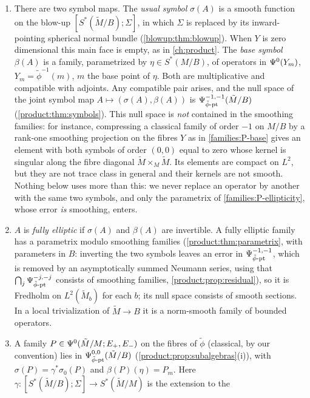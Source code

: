 \begin{enumerate}[label=(P\arabic*)]
\item\label{families:P-symbols} There are two symbol maps. The \emph{usual
  symbol} $\sigma(A)$ is a smooth function on the blow-up
  $[S^*(\tilde M/B);\Sigma]$, in which $\Sigma$ is replaced by its inward-pointing
  spherical normal bundle (\cref{blowup:thm:blowup}). When $Y$ is
  zero dimensional this main face is empty, as in \cref{ch:product}.
  The \emph{base symbol} $\beta(A)$ is a family,
  parametrized by $\eta\in S^*(M/B)$, of operators in $\Psi^{0}(Y_m)$,
  $Y_m=\tilde\phi^{-1}(m)$, $m$ the base point of $\eta$. Both are
  multiplicative and compatible with adjoints. Any compatible pair arises, and
  the null space of the joint symbol map $A\mapsto(\sigma(A),\beta(A))$ is
  $\Psi^{-1,-1}_{\tilde\phi\text{-}\mathrm{pt}}(\tilde M/B)$ (\cref{product:thm:symbols}). This null space
  is \emph{not} contained in the smoothing families: for instance, compressing a
  classical family of order $-1$ on $M/B$ by a rank-one smoothing projection on
  the fibres $Y$ as in \ref{families:P-base} gives an element with both
  symbols of order $(0,0)$ equal to zero whose kernel is singular along the
  fibre diagonal $\tilde M\times_M\tilde M$. Its elements are compact on
  $L^2$, but they are not trace class in general and their kernels are not
  smooth. Nothing below uses more than this: we never replace an operator by
  another with the same two symbols, and only the parametrix of
  \ref{families:P-ellipticity}, whose error \emph{is} smoothing, enters.
\item\label{families:P-ellipticity} $A$ is \emph{fully elliptic} if $\sigma(A)$
  and $\beta(A)$ are invertible. A fully elliptic family has a parametrix
  modulo smoothing families (\cref{product:thm:parametrix}, with parameters in
  $B$: inverting the two symbols leaves an error in $\Psi^{-1,-1}_{\tilde\phi\text{-}\mathrm{pt}}$, which
  is removed by an asymptotically summed Neumann series, using that
  $\bigcap_j\Psi^{-j,-j}_{\tilde\phi\text{-}\mathrm{pt}}$ consists of smoothing families,
  \cref{product:prop:residual}), so it is Fredholm on $L^2(\tilde M_b)$ for each
  $b$; its null space consists of smooth sections. In a local trivialization of
  $\tilde M\to B$ it is a norm-smooth family of bounded operators.
\item\label{families:P-fibre} A family $P\in\Psi^{0}(\tilde M/M;E_+,E_-)$ on
  the fibres of $\tilde\phi$ (classical, by our convention) lies in
  $\Psi^{0,0}_{\tilde\phi\text{-}\mathrm{pt}}(\tilde M/B)$ (\cref{product:prop:subalgebras}(i)), with
  $\sigma(P)=\gamma^*\sigma_0(P)$ and $\beta(P)(\eta)=P_m$. Here
  $\gamma:[S^*(\tilde M/B);\Sigma]\to S^*(\tilde M/M)$ is the extension to the

\end{enumerate}
